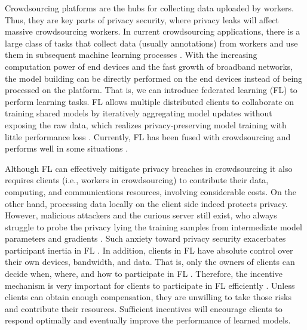 \documentclass[final,1p,times]{elsarticle}
\begin{document}
Crowdsourcing platforms are the hubs for collecting data uploaded by workers. Thus, they are key parts of privacy security, where privacy leaks will affect massive crowdsourcing workers. In current crowdsourcing applications, there is a large class of tasks that collect data (usually annotations) from workers and use them in subsequent machine learning processes \citep{Sheng2019MachineLW}. With the increasing computation power of end devices and the fast growth of broadband networks, the model building can be directly performed on the end devices instead of being processed on the platform. That is, we can introduce federated learning (FL) \citep{mcmahan2017communication} to perform learning tasks. FL allows multiple distributed clients to collaborate on training shared models by iteratively aggregating model updates without exposing the raw data, which realizes privacy-preserving model training with little performance loss \citep{Yang2019FederatedML,Gao2022ASO}. Currently, FL has been fused with crowdsourcing and performs well in some situations \citep{Pandey2019ACF,Tong2020FederatedLI,zhang2021enabling}.

Although FL can effectively mitigate privacy breaches in crowdsourcing it also requires clients (i.e., workers in crowdsourcing) to contribute their data, computing, and communications resources, involving considerable costs. On the other hand, processing data locally on the client side indeed protects privacy. However, malicious attackers and the curious server still exist, who always struggle to probe the privacy lying the training samples from intermediate model parameters and gradients \citep{lyu2020threats,Song2020AnalyzingUP}. Such anxiety toward privacy security exacerbates participant inertia in FL \citep{mothukuri2021survey}. In addition, clients in FL have absolute control over their own devices, bandwidth, and data. That is, only the owners of clients can decide when, where, and how to participate in FL \citep{Liu2021FromDM}. Therefore, the incentive mechanism is very important for clients to participate in FL efficiently \citep{zhan2021incentive}. Unless clients can obtain enough compensation, they are unwilling to take those risks and contribute their resources. Sufficient incentives will encourage clients to respond optimally and eventually improve the performance of learned models.
\end{document}
